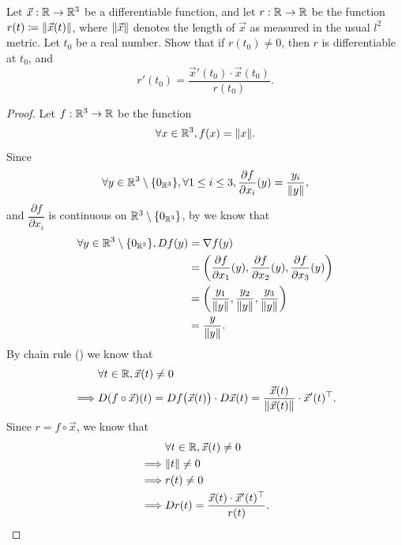 \begin{ex}\label{ii:ex:6.4.5}
  Let \(\vec{x} : \R \to \R^3\) be a differentiable function, and let \(r : \R \to \R\) be the function \(r(t) \coloneqq \norm*{\vec{x}(t)}\), where \(\norm*{\vec{x}}\) denotes the length of \(\vec{x}\) as measured in the usual \(l^2\) metric.
  Let \(t_0\) be a real number.
  Show that if \(r(t_0) \neq 0\), then \(r\) is differentiable at \(t_0\), and
  \[
    r'(t_0) = \dfrac{\vec{x}'(t_0) \cdot \vec{x}(t_0)}{r(t_0)}.
  \]
\end{ex}

\begin{proof}
  Let \(f : \R^3 \to \R\) be the function
  \[
    \forall x \in \R^3, f(x) = \norm*{x}.
  \]
  Since
  \[
    \forall y \in \R^3 \setminus \set{0_{\R^3}}, \forall 1 \leq i \leq 3, \dfrac{\partial f}{\partial x_i}(y) = \dfrac{y_i}{\norm*{y}},
  \]
  and \(\dfrac{\partial f}{\partial x_i}\) is continuous on \(\R^3 \setminus \set{0_{\R^3}}\), by  we know that
  \begin{align*}
    \forall y \in \R^3 \setminus \set{0_{\R^3}}, D f(y) & = \nabla f(y)                                                                                                               \\
                                                        & = \bigg(\dfrac{\partial f}{\partial x_1}(y), \dfrac{\partial f}{\partial x_2}(y), \dfrac{\partial f}{\partial x_3}(y)\bigg) \\
                                                        & = \bigg(\dfrac{y_1}{\norm*{y}}, \dfrac{y_2}{\norm*{y}}, \dfrac{y_3}{\norm*{y}}\bigg)                                        \\
                                                        & = \dfrac{y}{\norm*{y}}.
  \end{align*}
  By chain rule () we know that
  \begin{align*}
             & \forall t \in \R, \vec{x}(t) \neq 0                                                                                                  \\
    \implies & D (f \circ \vec{x})(t) = D f\big(\vec{x}(t)\big) \cdot D \vec{x}(t) = \dfrac{\vec{x}(t)}{\norm*{\vec{x}(t)}} \cdot \vec{x}'(t)^\top.
  \end{align*}
  Since \(r = f \circ \vec{x}\), we know that
  \begin{align*}
             & \forall t \in \R, \vec{x}(t) \neq 0                       \\
    \implies & \norm*{t} \neq 0                                          \\
    \implies & r(t) \neq 0                                               \\
    \implies & D r(t) = \dfrac{\vec{x}(t) \cdot \vec{x}'(t)^\top}{r(t)}.
  \end{align*}
\end{proof}
